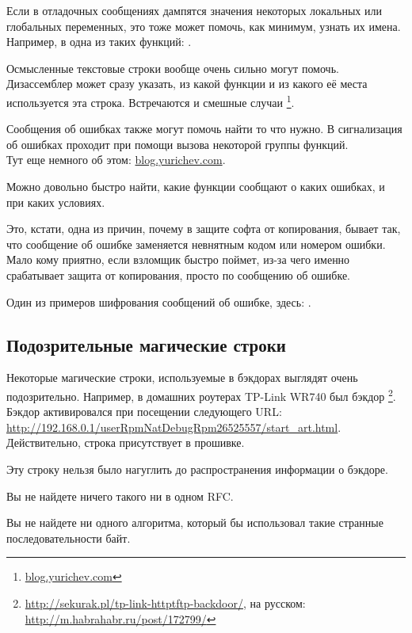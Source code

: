 \myindex{\oracle}
Если в отладочных сообщениях дампятся значения некоторых локальных или глобальных переменных, 
это тоже может помочь, как минимум, узнать их имена. 
Например, в \oracle одна из таких функций: .

Осмысленные текстовые строки вообще очень сильно могут помочь. 
Дизассемблер \IDA может сразу указать, из какой функции и из какого её места используется эта строка. 
Встречаются и смешные случаи
\footnote{\href{http://go.yurichev.com/17223}{blog.yurichev.com}}.

Сообщения об ошибках также могут помочь найти то что нужно. 
В \oracle сигнализация об ошибках проходит при помощи вызова некоторой группы функций. \\
Тут еще немного об этом: \href{http://go.yurichev.com/17224}{blog.yurichev.com}.

Можно довольно быстро найти, какие функции сообщают о каких ошибках, и при каких условиях.

Это, кстати, одна из причин, почему в защите софта от копирования, 
бывает так, что сообщение об ошибке заменяется 
невнятным кодом или номером ошибки. Мало кому приятно, если взломщик быстро поймет, 
из-за чего именно срабатывает защита от копирования, просто по сообщению об ошибке.

Один из примеров шифрования сообщений об ошибке, здесь: .

\subsection{Подозрительные магические строки}

Некоторые магические строки, используемые в бэкдорах выглядят очень подозрительно.
Например, в домашних роутерах TP-Link WR740 был бэкдор
\footnote{\url{http://sekurak.pl/tp-link-httptftp-backdoor/}, на русском: \url{http://m.habrahabr.ru/post/172799/}}.
Бэкдор активировался при посещении следующего URL:\\
\url{http://192.168.0.1/userRpmNatDebugRpm26525557/start_art.html}.\\
Действительно, строка  присутствует в прошивке.

Эту строку нельзя было нагуглить до распространения информации о бэкдоре.

Вы не найдете ничего такого ни в одном \ac{RFC}.

Вы не найдете ни одного алгоритма, который бы использовал такие странные последовательности байт.

